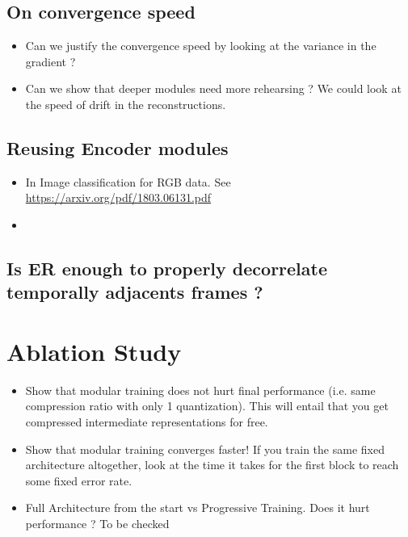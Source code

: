 \documentclass[colorinlistoftodos]{article} %
\begin{document}
\subsection{On convergence speed}
\begin{itemize}
    \item Can we justify the convergence speed by looking at the variance in the gradient ?
    \item Can we show that deeper modules need more rehearsing ? We could look at the speed of drift in the reconstructions. 
\end{itemize}

\subsection{Reusing Encoder modules}
\begin{itemize}
    \item In Image classification for RGB data. See \url{https://arxiv.org/pdf/1803.06131.pdf}
    \item 
\end{itemize}

\subsection{Is ER enough to properly decorrelate temporally adjacents frames ?}



\section{Ablation Study}
\begin{itemize}
    \item Show that modular training does not hurt final performance (i.e. same compression ratio with only 1 quantization). This will entail that you get compressed intermediate representations for free. 
    \item Show that modular training converges faster! If you train the same fixed architecture altogether, look at the time it takes for the first block to reach some fixed error rate. 
    \item Full Architecture from the start vs Progressive Training. Does it hurt performance ? To be checked
\end{itemize}
\end{document}
